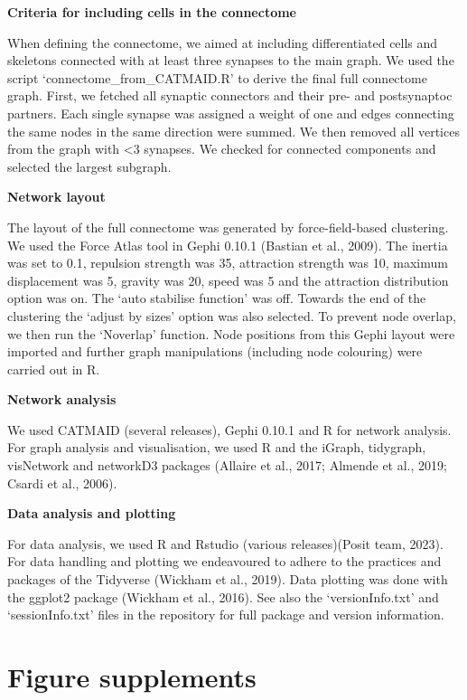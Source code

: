 \documentclass[
  11pt,
]{article}
\begin{document}
\textbf{Criteria for including cells in the connectome}

When defining the connectome, we aimed at including differentiated cells
and skeletons connected with at least three synapses to the main graph.
We used the script `connectome\_from\_CATMAID.R' to derive the final
full connectome graph. First, we fetched all synaptic connectors and
their pre- and postsynaptoc partners. Each single synapse was assigned a
weight of one and edges connecting the same nodes in the same direction
were summed. We then removed all vertices from the graph with \textless3
synapses. We checked for connected components and selected the largest
subgraph.

\textbf{Network layout}

The layout of the full connectome was generated by force-field-based
clustering. We used the Force Atlas tool in Gephi 0.10.1 (Bastian et
al., 2009). The inertia was set to 0.1, repulsion strength was 35,
attraction strength was 10, maximum displacement was 5, gravity was 20,
speed was 5 and the attraction distribution option was on. The `auto
stabilise function' was off. Towards the end of the clustering the
`adjust by sizes' option was also selected. To prevent node overlap, we
then run the `Noverlap' function. Node positions from this Gephi layout
were imported and further graph manipulations (including node colouring)
were carried out in R.

\textbf{Network analysis}

We used CATMAID (several releases), Gephi 0.10.1 and R for network
analysis. For graph analysis and visualisation, we used R and the
iGraph, tidygraph, visNetwork and networkD3 packages (Allaire et al.,
2017; Almende et al., 2019; Csardi et al., 2006).

\textbf{Data analysis and plotting}

For data analysis, we used R and Rstudio (various releases)(Posit team,
2023). For data handling and plotting we endeavoured to adhere to the
practices and packages of the Tidyverse (Wickham et al., 2019). Data
plotting was done with the ggplot2 package (Wickham et al., 2016). See
also the `versionInfo.txt' and `sessionInfo.txt' files in the repository
for full package and version information.

\section{Figure supplements}\label{figure-supplements}
\end{document}
